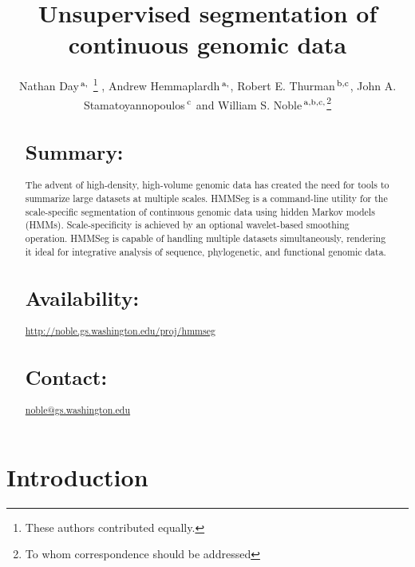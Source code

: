\documentclass{bioinfo}
\newcommand{\footnoteremember}[2]{
  \footnote{#2} \newcounter{#1} \setcounter{#1}{\value{footnote}}}
\newcommand{\footnoterecall}[1]{\footnotemark[\value{#1}]}
\begin{document}

\title[Unsupervised segmentation of continuous genomic data]{Unsupervised
  segmentation of continuous genomic data}
\author[Day \textit{et~al}]{Nathan Day\,$^{\rm
  a,}$\footnoteremember{foot1}{These authors contributed equally.}, 
Andrew Hemmaplardh\,$^{\rm a,}$\footnoterecall{foot1},
Robert E. Thurman\,$^{\rm b,c}$, John A. Stamatoyannopoulos\,$^{\rm c}$ and
William S. Noble\,$^{\rm a,b,c,}$\footnote{To whom correspondence should be addressed}}
\address{
$^{\rm a}$Department of Computer Science and Engineering,
$^{\rm b}$Division of Medical Genetics,
$^{\rm c}$Department of Genome Sciences, University of Washington,
  Seattle, WA, USA
}
\maketitle

\begin{abstract}
\section{Summary:}
The advent of high-density, high-volume genomic data has created the
need for tools to summarize large datasets at multiple scales.  HMMSeg
is a command-line utility for the scale-specific segmentation of
continuous genomic data using hidden Markov models (HMMs).
Scale-specificity is achieved by an optional wavelet-based smoothing
operation.  HMMSeg is capable of handling multiple datasets
simultaneously, rendering it ideal for integrative analysis of
sequence, phylogenetic, and functional genomic data.
\section{Availability:}
\href{http://noble.gs.washington.edu/proj/hmmseg}{http://noble.gs.washington.edu/proj/hmmseg}
\section{Contact:} \href{noble@gs.washington.edu}{noble@gs.washington.edu}
\end{abstract}

\section{Introduction}
\end{document}
